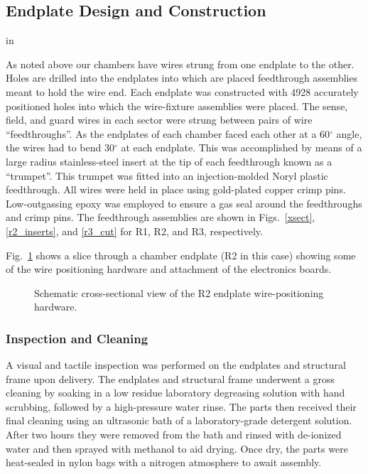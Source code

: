 \subsection{Endplate Design and Construction}
 in

As noted above our chambers have wires strung from one endplate to 
the other.  Holes are drilled into the endplates into which are
placed feedthrough assemblies meant to hold the wire end.
Each endplate was constructed with 4928 accurately positioned holes into 
which the 
wire-fixture assemblies were placed.  The sense, field, and guard wires in each 
sector were strung between pairs of wire ``feedthroughs''.  As the endplates of 
each chamber faced each other at a 60$^{\circ}$ angle, the wires had to bend 
30$^{\circ}$ at each endplate.  This was accomplished by means of a large radius 
stainless-steel insert at the tip of each feedthrough known as a ``trumpet''.
This trumpet was fitted into an injection-molded Noryl plastic feedthrough.  
All wires were held in place using gold-plated copper crimp pins.  
Low-outgassing epoxy was employed to ensure a gas seal around the feedthroughs 
and crimp pins.  The feedthrough assemblies
are shown in Figs.~\ref{xsect}, \ref{r2_inserts}, and \ref{r3_cut} for R1, R2, 
and R3, respectively.

Fig.~\ref{dc-corner} shows a slice through a chamber endplate (R2 in this case)
showing some of the wire positioning hardware and attachment of the electronics 
boards.
\begin{figure}[htpb]   
\vspace{4.5cm}
\caption{\small{Schematic cross-sectional view of the R2 endplate 
wire-positioning hardware.}}
\label{dc-corner}
\end{figure}   



\subsubsection{Inspection and Cleaning}

A visual and tactile inspection was performed on the endplates and 
structural frame upon delivery.  The endplates and structural 
frame underwent a gross cleaning by soaking in a low residue laboratory 
degreasing solution with hand scrubbing, followed by a high-pressure water 
rinse. The parts then received their final cleaning using an ultrasonic 
bath of a laboratory-grade detergent solution.  After two hours they were
removed from the bath and rinsed with de-ionized water and then sprayed 
with methanol to aid drying. Once dry, the parts were heat-sealed in nylon 
bags with a nitrogen atmosphere to await assembly.

